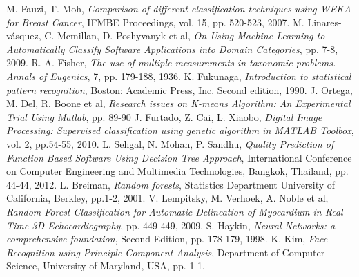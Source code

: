 \documentclass[conference]{IEEEtran}
\begin{document}
%
%
%
\begin{thebibliography}{1}

M. Fauzi, T. Moh, \emph{Comparison of different classification techniques using WEKA for Breast Cancer}, IFMBE Proceedings, vol. 15, pp. 520-523, 2007.
M. Linares-vásquez, C. Mcmillan, D. Poshyvanyk et al, \emph{On Using Machine Learning to Automatically Classify Software Applications into Domain Categories}, pp. 7-8, 2009.
R. A. Fisher, \emph{The use of multiple measurements in taxonomic problems. Annals of Eugenics},
7, pp. 179-188, 1936.
K. Fukunaga, \emph{Introduction to statistical pattern recognition}, Boston: Academic Press, Inc. Second edition, 1990. 
J. Ortega, M. Del, R. Boone et al, \emph{Research issues on K-means Algorithm: An Experimental Trial Using Matlab}, pp. 89-90
J. Furtado, Z. Cai, L. Xiaobo, \emph{Digital Image Processing: Supervised classification using genetic algorithm in MATLAB Toolbox}, vol. 2, pp.54-55, 2010.
L. Sehgal, N. Mohan, P. Sandhu, \emph{Quality Prediction of Function Based Software Using Decision Tree Approach}, International Conference on Computer Engineering and Multimedia Technologies, Bangkok, Thailand, pp. 44-44, 2012.
L. Breiman, \emph{Random forests}, Statistics Department University of California, Berkley, pp.1-2, 2001.
V. Lempitsky, M. Verhoek, A. Noble et al, \emph{Random Forest Classification for Automatic Delineation of Myocardium in Real-Time 3D Echocardiography}, pp. 449-449, 2009.
S. Haykin, \emph{Neural Networks: a comprehensive foundation}, Second Edition, pp. 178-179, 1998.
K. Kim, \emph{Face Recognition using Principle Component Analysis}, Department of Computer Science, University of Maryland, USA, pp. 1-1.

\end{thebibliography}
\end{document}
